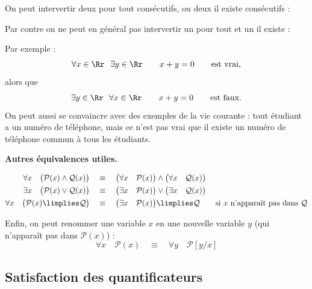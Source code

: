 \documentclass[11pt,class=report,crop=false]{standalone}
\begin{document}
On peut intervertir deux \og{}pour tout\fg{} consécutifs, ou deux \og{}il existe\fg{} consécutifs :

Par contre on ne peut en général pas intervertir un \og{}pour tout\fg{} et un \og{}il existe\fg{} :

Par exemple :
\[
\forall x \in \Rr \ \ \exists y \in \Rr \qquad x+y=0 \qquad \text{est vrai,}
\]
alors que 
\[
\exists y \in \Rr \ \ \forall x \in \Rr \qquad x+y=0 \qquad \text{est faux.}
\]
On peut aussi se convaincre avec des exemples de la vie courante : \og{}tout étudiant a un numéro de téléphone\fg{}, mais ce n'est pas vrai que \og{}il existe un numéro de téléphone commun à tous les étudiants\fg{}.


\bigskip

\textbf{Autres équivalences utiles.}

\begin{align*}
\forall x \quad \big( \mathcal{P}(x) \land \mathcal{Q}(x) \big)
&\quad \equiv \quad
 \big(\forall x \quad \mathcal{P}(x) \big )\land \big(\forall x \quad \mathcal{Q}(x) \big) \\
\exists x \quad \big( \mathcal{P}(x) \lor \mathcal{Q}(x) \big)
&\quad \equiv \quad
\big(\exists x \quad \mathcal{P}(x) \big )\lor \big(\exists x \quad \mathcal{Q}(x) \big) \\ 
\forall x \quad \big( \mathcal{P}(x) \limplies \mathcal{Q} \big)
&\quad \equiv \quad
\big(\exists x \quad \mathcal{P}(x) \big )\limplies \mathcal{Q} 
\qquad \text{si $x$ n'apparaît pas dans $\mathcal{Q}$}
\end{align*}

Enfin, on peut renommer une variable $x$ en une nouvelle variable $y$ (qui n'apparaît pas dans $\mathcal{P}(x)$) :
\[
\forall x \quad \mathcal{P}(x) 
\quad \equiv \quad
\forall y \quad \mathcal{P}[y/x] 
\]

\subsection{Satisfaction des quantificateurs}

\end{document}
